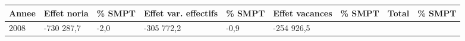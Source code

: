 \begin{longtable}[]{@{}lllllllll@{}}
\toprule
\begin{minipage}[b]{0.05\columnwidth}\raggedright
Annee\strut
\end{minipage} & \begin{minipage}[b]{0.10\columnwidth}\raggedright
Effet noria\strut
\end{minipage} & \begin{minipage}[b]{0.06\columnwidth}\raggedright
\% SMPT\strut
\end{minipage} & \begin{minipage}[b]{0.16\columnwidth}\raggedright
Effet var. effectifs\strut
\end{minipage} & \begin{minipage}[b]{0.06\columnwidth}\raggedright
\% SMPT\strut
\end{minipage} & \begin{minipage}[b]{0.12\columnwidth}\raggedright
Effet vacances\strut
\end{minipage} & \begin{minipage}[b]{0.06\columnwidth}\raggedright
\% SMPT\strut
\end{minipage} & \begin{minipage}[b]{0.10\columnwidth}\raggedright
Total\strut
\end{minipage} & \begin{minipage}[b]{0.06\columnwidth}\raggedright
\% SMPT\strut
\end{minipage}\tabularnewline
\midrule
\endhead
\begin{minipage}[t]{0.05\columnwidth}\raggedright
2008\strut
\end{minipage} & \begin{minipage}[t]{0.10\columnwidth}\raggedright
-730 287,7\strut
\end{minipage} & \begin{minipage}[t]{0.06\columnwidth}\raggedright
-2,0\strut
\end{minipage} & \begin{minipage}[t]{0.16\columnwidth}\raggedright
-305 772,2\strut
\end{minipage} & \begin{minipage}[t]{0.06\columnwidth}\raggedright
-0,9\strut
\end{minipage} & \begin{minipage}[t]{0.12\columnwidth}\raggedright
-254 926,5\strut
\end{minipage} & \begin{minipage}[t]{0.06\columnwidth}\raggedright

\end{minipage}
\end{longtable}
